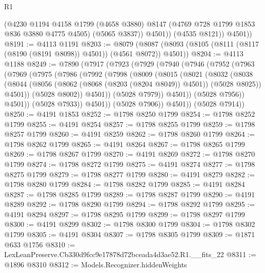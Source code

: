 \begin{lexlean}{R1}
\begin{coremodule}
              (@4230
                @1194
                @4158
                @1799
                (@4658 @3880)
                @8147
                (@4769 @728 @1799 @1853 @836 @3880 @4775 @4505)
                (@5065 @3837))
              @4501))
          (@4535 @8121))
        @4501))
@8191 := @4113 @1191
@8203 := @8079
    (@8087 (@8093 (@8105 (@8111 (@8117 (@8190 (@8191 @8098)) @4501)) (@4561 @8072)) @4501))
@8204 := @4113 @1188
@8249 := @7890
    (@7917
      (@7923
        (@7929
          (@7940
            (@7946
              (@7952
                (@7963
                  (@7969
                    (@7975
                      (@7986
                        (@7992
                          (@7998
                            (@8009
                              (@8015
                                (@8021
                                  (@8032
                                    (@8038
                                      (@8044
                                        (@8056
                                          (@8062 (@8068 (@8203 (@8204 @8049)) @4501))
                                          (@5028 @8025))
                                        @4501))
                                    (@5028 @8002))
                                  @4501))
                              (@5028 @7979))
                            @4501))
                        (@5028 @7956))
                      @4501))
                  (@5028 @7933))
                @4501))
            (@5028 @7906))
          @4501))
      (@5028 @7914))
@8250 := @4191 @1853
@8252 := @1798 @8250 @1799
@8254 := @1798 @8252 @1799
@8255 := @4191 @8254
@8257 := @1798 @8255 @1799
@8259 := @1798 @8257 @1799
@8260 := @4191 @8259
@8262 := @1798 @8260 @1799
@8264 := @1798 @8262 @1799
@8265 := @4191 @8264
@8267 := @1798 @8265 @1799
@8269 := @1798 @8267 @1799
@8270 := @4191 @8269
@8272 := @1798 @8270 @1799
@8274 := @1798 @8272 @1799
@8275 := @4191 @8274
@8277 := @1798 @8275 @1799
@8279 := @1798 @8277 @1799
@8280 := @4191 @8279
@8282 := @1798 @8280 @1799
@8284 := @1798 @8282 @1799
@8285 := @4191 @8284
@8287 := @1798 @8285 @1799
@8289 := @1798 @8287 @1799
@8290 := @4191 @8289
@8292 := @1798 @8290 @1799
@8294 := @1798 @8292 @1799
@8295 := @4191 @8294
@8297 := @1798 @8295 @1799
@8299 := @1798 @8297 @1799
@8300 := @4191 @8299
@8302 := @1798 @8300 @1799
@8304 := @1798 @8302 @1799
@8305 := @4191 @8304
@8307 := @1798 @8305 @1799
@8309 := @1871 @633 @1756
@8310 := LexLeanPreserve.Cb330d9fcc9e17878d72bceada4d3ae52.R1.__fits_22
@8311 := @1896 @8310
@8312 := Models.Recognizer.hiddenWeights

\end{coremodule}
\end{lexlean}
